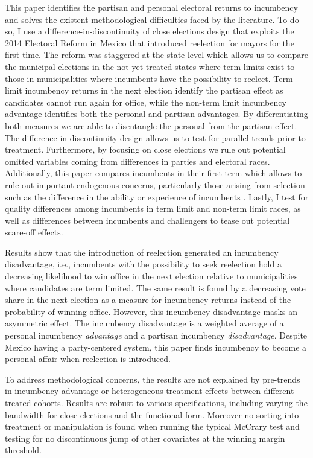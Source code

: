 \documentclass[12pt]{amsart}
\numberwithin{equation}{section}
\theoremstyle{definition}
\theoremstyle{definition}
\theoremstyle{definition}
\begin{document}
This paper identifies the partisan and personal electoral returns to incumbency and solves the existent methodological difficulties faced by the literature. To do so, I use a difference-in-discontinuity of close elections design that exploits the 2014 Electoral Reform in Mexico that introduced reelection for mayors for the first time. The reform was staggered at the state level which allows us to compare the municipal elections in the not-yet-treated states where term limits exist to those in municipalities where incumbents have the possibility to reelect. Term limit incumbency returns in the next election identify the partisan effect as candidates cannot run again for office, while the non-term limit incumbency advantage identifies both the personal and partisan advantages. By differentiating both measures we are able to disentangle the personal from the partisan effect. The difference-in-discontinuity design allows us to test for parallel trends prior to treatment. Furthermore, by focusing on close elections we rule out potential omitted variables coming from differences in parties and electoral races. Additionally, this paper compares incumbents in their first term which allows to rule out important endogenous concerns, particularly those arising from selection such as the difference in the ability or experience of incumbents \citep{ferraz_finan_2008, ferraz_finan_2011}. Lastly, I test for quality differences among incumbents in term limit and non-term limit races, as well as differences between incumbents and challengers to tease out potential scare-off effects. 
 

Results show that the introduction of reelection generated an incumbency disadvantage, i.e., incumbents with the possibility to seek reelection hold a decreasing likelihood to win office in the next election relative to municipalities where candidates are term limited. The same result is found by a decreasing vote share in the next election as a measure for incumbency returns instead of the probability of winning office. However, this incumbency disadvantage masks an asymmetric effect. The incumbency disadvantage is a weighted average of a personal incumbency \emph{advantage} and a partisan incumbency \emph{disadvantage}. Despite Mexico having a party-centered system, this paper finds incumbency to become a personal affair when reelection is introduced. 

To address  methodological concerns, the results are not explained by pre-trends in incumbency advantage or heterogeneous treatment effects between different treated cohorts. Results are robust to various specifications, including varying the bandwidth for close elections and the functional form. Moreover no sorting into treatment or manipulation is found when running the typical McCrary test and testing for no discontinuous jump of other covariates at the winning margin threshold. 
\end{document}
